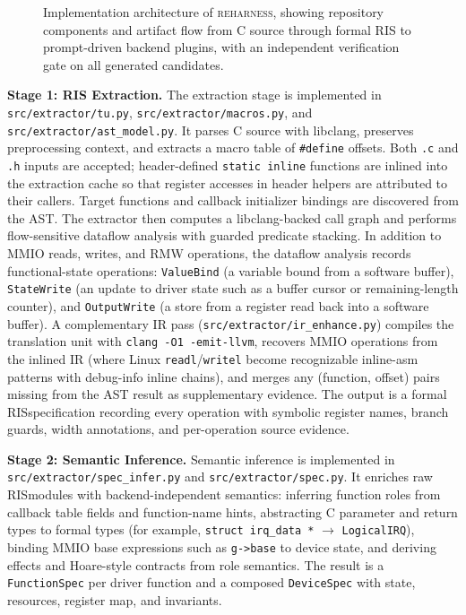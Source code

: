 \documentclass[sigplan, screen, review, anonymous]{acmart}
\newcommand{\reharness}{\textsc{reharness}}
\newcommand{\rislang}{RIS}
\begin{document}
\begin{figure}[t]
{%
}
\caption{Implementation architecture of \reharness, showing repository components and artifact flow from C source through formal RIS to prompt-driven backend plugins, with an independent verification gate on all generated candidates.}
\label{fig:impl_arch}
\end{figure}

\textbf{Stage 1: RIS Extraction.} The extraction stage is implemented in \texttt{src/extractor/tu.py}, \texttt{src/extractor/macros.py}, and \texttt{src/extractor/ast\_model.py}. It parses C source with libclang, preserves preprocessing context, and extracts a macro table of \texttt{\#define} offsets. Both \texttt{.c} and \texttt{.h} inputs are accepted; header-defined \texttt{static inline} functions are inlined into the extraction cache so that register accesses in header helpers are attributed to their callers. Target functions and callback initializer bindings are discovered from the AST. The extractor then computes a libclang-backed call graph and performs flow-sensitive dataflow analysis with guarded predicate stacking. In addition to MMIO reads, writes, and RMW operations, the dataflow analysis records functional-state operations: \texttt{ValueBind} (a variable bound from a software buffer), \texttt{StateWrite} (an update to driver state such as a buffer cursor or remaining-length counter), and \texttt{OutputWrite} (a store from a register read back into a software buffer). A complementary IR pass (\texttt{src/extractor/ir\_enhance.py}) compiles the translation unit with \texttt{clang -O1 -emit-llvm}, recovers MMIO operations from the inlined IR (where Linux \texttt{readl}/\texttt{writel} become recognizable inline-asm patterns with debug-info inline chains), and merges any (function, offset) pairs missing from the AST result as supplementary evidence. The output is a formal \rislang specification recording every operation with symbolic register names, branch guards, width annotations, and per-operation source evidence.

\textbf{Stage 2: Semantic Inference.} Semantic inference is implemented in \texttt{src/extractor/spec\_infer.py} and \texttt{src/extractor/spec.py}. It enriches raw \rislang modules with backend-independent semantics: inferring function roles from callback table fields and function-name hints, abstracting C parameter and return types to formal types (for example, \texttt{struct irq\_data *} $\rightarrow$ \texttt{LogicalIRQ}), binding MMIO base expressions such as \texttt{g->base} to device state, and deriving effects and Hoare-style contracts from role semantics. The result is a \texttt{FunctionSpec} per driver function and a composed \texttt{DeviceSpec} with state, resources, register map, and invariants.
\end{document}
